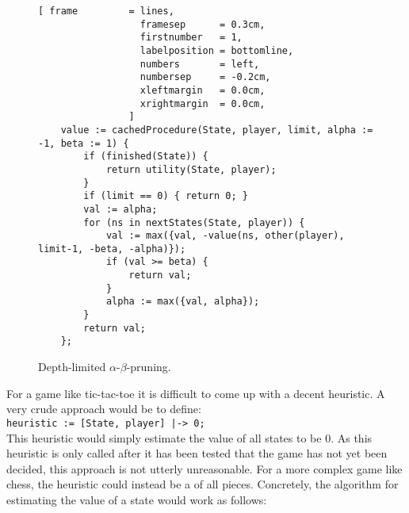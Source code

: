 \begin{figure}[!ht]
\centering
\begin{Verbatim}[ frame         = lines, 
                  framesep      = 0.3cm, 
                  firstnumber   = 1,
                  labelposition = bottomline,
                  numbers       = left,
                  numbersep     = -0.2cm,
                  xleftmargin   = 0.0cm,
                  xrightmargin  = 0.0cm,
                ]
    value := cachedProcedure(State, player, limit, alpha := -1, beta := 1) {
        if (finished(State)) {
            return utility(State, player);
        }
        if (limit == 0) { return 0; }
        val := alpha;
        for (ns in nextStates(State, player)) {
            val := max({val, -value(ns, other(player), limit-1, -beta, -alpha)});
            if (val >= beta) {
                return val;
            }
            alpha := max({val, alpha});
        }
        return val;
    };
\end{Verbatim}
\vspace*{-0.3cm}
\caption{Depth-limited $\alpha$-$\beta$-pruning.}
\label{fig:game-limit.stlx}
\end{figure}
For a game like tic-tac-toe it is difficult to come up with a decent heuristic.  A very crude approach would be
to define:
\\[0.2cm]
\hspace*{1.3cm}
\texttt{heuristic := [State, player] |-> 0;}
\\[0.2cm]
This heuristic would simply estimate the value of all states to be $0$.  As this heuristic is only called after
it has been tested that the game has not yet been decided, this approach is not utterly unreasonable.  For a more
complex game like chess, the heuristic could instead be a  of all pieces.  Concretely, the
algorithm for estimating the value of a state would work as follows:

